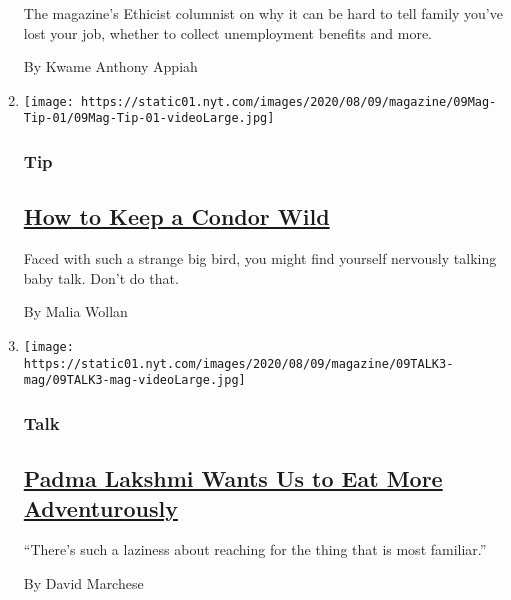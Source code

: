 \begin{enumerate}
  The magazine's Ethicist columnist on why it can be hard to tell family
  you've lost your job, whether to collect unemployment benefits and
  more.

  By Kwame Anthony Appiah
\item
  \texttt{[image: https://static01.nyt.com/images/2020/08/09/magazine/09Mag-Tip-01/09Mag-Tip-01-videoLarge.jpg]}

  \hypertarget{tip}{%
  \subsubsection{Tip}\label{tip}}

  \hypertarget{how-to-keep-a-condor-wild}{%
  \subsection{\texorpdfstring{\href{/2020/08/04/magazine/condors-yurok-tribe.html}{How
  to Keep a Condor
  Wild}}{How to Keep a Condor Wild}}\label{how-to-keep-a-condor-wild}}

  Faced with such a strange big bird, you might find yourself nervously
  talking baby talk. Don't do that.

  By Malia Wollan
\item
  \texttt{[image: https://static01.nyt.com/images/2020/08/09/magazine/09TALK3-mag/09TALK3-mag-videoLarge.jpg]}

  \hypertarget{talk}{%
  \subsubsection{Talk}\label{talk}}

  \hypertarget{padma-lakshmi-wants-us-to-eat-more-adventurously}{%
  \subsection{\texorpdfstring{\href{/interactive/2020/08/03/magazine/padma-lakshmi-interview.html}{Padma
  Lakshmi Wants Us to Eat More
  Adventurously}}{Padma Lakshmi Wants Us to Eat More Adventurously}}\label{padma-lakshmi-wants-us-to-eat-more-adventurously}}

  ``There's such a laziness about reaching for the thing that is most
  familiar.''

  By David Marchese
\end{enumerate}

